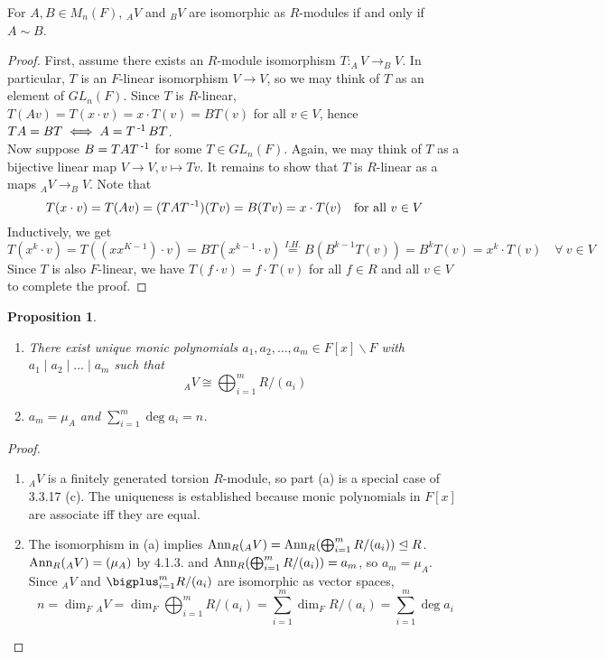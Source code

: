 \documentclass[11pt]{book}
\newcounter{counter}
\newtheorem{proposition}[counter]{Proposition}   \newtheorem{problem}[counter]{Problem}   \newtheorem*{proposition*}{Proposition}   \newtheorem*{lemma*}{Lemma}
\theoremstyle{definition}   \newtheorem{defn}[counter]{Definition} %
\newcommand{\bs}{\backslash}   \newcommand{\A}{\mathcal{A}}   \newcommand{\sy}{\textnormal{Syl}}   \newcommand{\size}[1]{\left| #1 \right|}
\newcommand{\nsg}{\mathrel{\unlhd}}   \newcommand{\ind}{\parindent24pt}   \newcommand{\vn}{\varnothing}
\newcommand{\ann}[2]{\textnormal{Ann}_{#1}(#2)}   \newcommand{\rk}{\textnormal{rk}}
\DeclareMathOperator{\ra}{\rightarrow}   \DeclareMathOperator{\Poly}{\mathbf{P}}   \DeclareMathOperator{\spn}{\textnormal{span}}   \DeclareMathOperator{\aut}{\textnormal{Aut}}
\newcommand{\vs}{\vspace{8pt}}
\numberwithin{counter}{chapter}
\begin{document}
\vs

\begin{lemma}
For $A,B \in M_n(F)$, $_AV$ and $_BV$ are isomorphic as $R$-modules if and only if $A \sim B$.
\end{lemma}

\begin{proof}
First, assume there exists an $R$-module isomorphism $T : _AV \ra _BV$. In particular, $T$ is an $F$-linear isomorphism $V \ra V$, so we may think of $T$ as an element of $GL_n(F)$. Since $T$ is $R$-linear, \\ $T(Av) = T(x \cdot v) = x \cdot T(v) = B T(v)$ for all $v \in V$, hence $TA = BT \iff A = T\operatorname{^{-1}} BT$. \\

Now suppose $B = TAT\operatorname{^{-1}}$ for some $T \in GL_n(F)$. Again, we may think of $T$ as a bijective linear map $V \ra V, v \mapsto Tv$. It remains to show that $T$ is $R$-linear as a maps $_AV \ra _BV$. Note that
	\[T(x \cdot v) = T(Av) = (TAT\operatorname{^{-1}})(Tv) = B(Tv) = x \cdot T(v) \quad \textnormal{for all } v \in V \]
Inductively, we get
	\[T(x^k \cdot v) = T((x x^{K-1}) \cdot v) = B T(x^{k-1} \cdot v) \overset{I. H.}{=} B(B^{k-1} T(v)) = B^k T(v) = x^{k} \cdot T(v) \quad \forall \ v \in V \]
Since $T$ is also $F$-linear, we have $T(f \cdot v) = f \cdot T(v)$ for all $f \in R$ and all $v \in V$ to complete the proof.
\end{proof}

\vs

\begin{proposition}\
\begin{enumerate}
\item[(a)] There exist unique monic polynomials $a_1,a_2,\dots,a_m \in F[x]\bs F$ with $a_1 \mid a_2 \mid \dots \mid a_m$ such that
	\[_AV \cong \bigoplus_{i=1}^m R/(a_i) \]
\item[(b)] $a_m = \mu_A$ and $\sum_{i=1}^m \deg a_i = n$.
\end{enumerate}
\end{proposition}

\begin{proof}\
\begin{enumerate}
\item[(a)] $_AV$ is a finitely generated torsion $R$-module, so part (a) is a special case of 3.3.17 (c). The uniqueness is established because monic polynomials in $F[x]$ are associate iff they are equal.
\item[(b)] The isomorphism in (a) implies $\ann{R}{_AV} = \ann{R}{\bigoplus_{i=1}^m R/(a_i)} \nsg R$. $\ann{R}{_AV} = (\mu_A)$ by 4.1.3. and $\ann{R}{\bigoplus_{i=1}^m R/(a_i)} = a_m$, so $a_m = \mu_A$. Since $_AV$ and $\bigplus_{i=1}^m R/(a_i)$ are isomorphic as vector spaces,
	\[n = \dim_F {_AV} = \dim_F \bigoplus_{i=1}^m R/(a_i) = \sum_{i=1}^m \dim_F R/(a_i) = \sum_{i=1}^m \deg a_i \]
\end{enumerate}
\end{proof}
\end{document}
